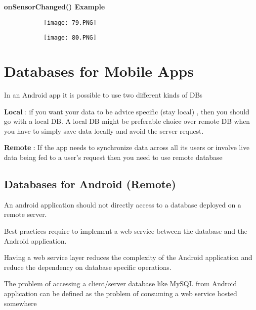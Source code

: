 \documentclass{article}
\begin{document}
  \vspace{30mm}

\textbf{onSensorChanged() Example}

      \begin{figure}[ht!]
  \centering
  \begin{subfigure}[b]{1\linewidth}
  \texttt{[image: 79.PNG]}
  \end{subfigure}
  \end{figure}

        \begin{figure}[ht!]
  \centering
  \begin{subfigure}[b]{1\linewidth}
  \texttt{[image: 80.PNG]}
  \end{subfigure}
  \end{figure}


\vspace{20mm}

  \section{Databases for Mobile Apps}

  In an Android app it is possible to use two different kinds of DBs

\textbf{Local} : if you want your data to be advice specific (stay local) , then you should go with a local DB. A local DB might be preferable choice over remote DB when you have to simply save data locally and avoid the server request.


\textbf{Remote} : If the app needs to synchronize data across all its users or involve live data being fed to a user's request then you need to use remote database

\subsection{Databases for Android (Remote)}

An android application should not directly access to a database deployed on a remote server.

Best practices require to implement a web service between the database and the Android application.

Having a web service layer reduces the complexity of the Android application and reduce the dependency on database specific operations.

The problem of accessing a client/server database like MySQL from Android application can be defined as the problem of consuming a web service hosted somewhere
\end{document}
